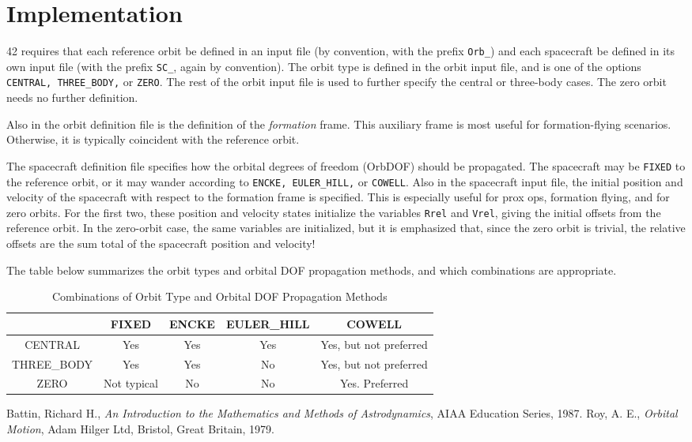 \documentclass[12pt]{article}
\begin{document}
\section{Implementation}

42 requires that each reference orbit be defined in an input file (by convention, with the prefix {\tt Orb\_}) and each spacecraft be defined in its own input file (with the prefix {\tt SC\_}, again by convention).  The orbit type is defined in the orbit input file, and is one of the options {\tt CENTRAL, THREE\_BODY,} or {\tt ZERO}.  The rest of the orbit input file is used to further specify the central or three-body cases.  The zero orbit needs no further definition.

Also in the orbit definition file is the definition of the {\em formation} frame.  This auxiliary frame is most useful for formation-flying scenarios.  Otherwise, it is typically coincident with the reference orbit.

The spacecraft definition file specifies how the orbital degrees of freedom (OrbDOF) should be propagated.  The spacecraft may be {\tt FIXED} to the reference orbit, or it may wander according to {\tt ENCKE, EULER\_HILL,} or {\tt COWELL}.  Also in the spacecraft input file, the initial position and velocity of the spacecraft with respect to the formation frame is specified.  This is especially useful for prox ops, formation flying, and for zero orbits.  For the first  two, these position and velocity states initialize the variables {\tt Rrel} and {\tt Vrel}, giving the initial offsets from the reference orbit.  In the zero-orbit case, the same variables are initialized, but it is emphasized that, since the zero orbit is trivial, the relative offsets are the sum total of the spacecraft position and velocity!

The table below summarizes the orbit types and orbital DOF propagation methods, and which combinations are appropriate.
\begin{table}[h]
\caption{Combinations of Orbit Type and Orbital DOF Propagation Methods}
\begin{center}
\begin{tabular}{|c||c|c|c|c|} \hline
                           & FIXED & ENCKE & EULER\_HILL & COWELL \\ \hline \hline
 CENTRAL         & Yes      & Yes        & Yes               & Yes, but not preferred \\ \hline
 THREE\_BODY & Yes       & Yes        & No                & Yes, but not preferred \\ \hline
 ZERO               &  Not typical & No   & No                & Yes.  Preferred \\ \hline

\end{tabular}
\end{center}
\label{tab:Orb}
\end{table}%


\begin{thebibliography}{9}
Battin, Richard H., {\it An Introduction to the Mathematics and Methods of Astrodynamics}, AIAA Education Series, 1987.
Roy, A. E., {\it Orbital Motion}, Adam Hilger Ltd, Bristol, Great Britain, 1979.
\end{thebibliography}
\end{document}
